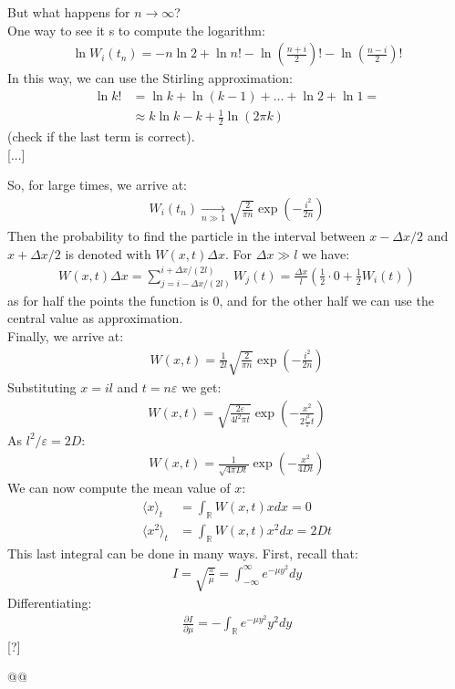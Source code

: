 \documentclass[../template.tex]{subfiles}
\begin{document}
But what happens for $n\to \infty$?\\
One way to see it s to compute the logarithm:
\begin{align*}
    \ln W_i(t_n) = -n \ln 2 + \ln n! - \ln \left(\frac{n+i}{2}\right)! - \ln \left(\frac{n-i}{2}\right)!
\end{align*}
In this way, we can use the Stirling approximation:
\begin{align*}
    \ln k! &= \ln k + \ln(k-1) + \dots + \ln 2 + \ln 1 = \\
    &\approx k\ln k - k  + \frac{1}{2} \ln(2\pi k) 
\end{align*}
(check if the last term is correct).\\

[...]

So, for large times, we arrive at: 
\begin{align*}
    W_i(t_n) \xrightarrow[n\gg 1]{} \sqrt{\frac{2}{\pi n}} \exp\left({-\frac{i^2}{2n}}\right)
\end{align*} 
Then the probability to find the particle in the interval between $x-\Delta x/2$ and $x+ \Delta x/2$ is denoted with $W(x,t) \Delta x$. For $\Delta x \gg l$ we have: 
\begin{align*}
    W(x,t) \Delta x = \sum_{j=i- \Delta x/(2l)}^{i+ \Delta x/(2l)} W_j(t) = \frac{\Delta x}{l} \left(\frac{1}{2} \cdot 0 + \frac{1}{2} W_i(t)\right)
\end{align*}    
as for half the points the function is $0$, and for the other half we can use the central value as approximation.\\
Finally, we arrive at: 
\begin{align*}
    W(x,t) = \frac{1}{2l} \sqrt{\frac{2}{\pi n}} \exp\left(-\frac{i^2}{2n}\right)
\end{align*}
Substituting $x=il$ and $t = n \varepsilon$ we get: 
\begin{align*}
    W(x,t) = \sqrt{\frac{2 \varepsilon}{4l^2 \pi t}} \exp \left(-\frac{x^2}{2 \frac{l^2}{\varepsilon} t}\right)
\end{align*}  
As $l^2/\varepsilon = 2D$: 
\begin{align*}
    W(x,t) = \frac{1}{\sqrt{4 \pi D t}} \exp\left(-\frac{x^2}{4Dt}\right)
\end{align*} 
We can now compute the mean value of $x$:
\begin{align*}
    \langle x \rangle_t &= \int_{\mathbb{R}} W(x,t) x dx = 0\\
    \langle x^2 \rangle_t &= \int_{\mathbb{R}} W(x,t) x^2 dx = 2Dt
\end{align*}
This last integral can be done in many ways. First, recall that: 
\begin{align*}
    I = \sqrt{\frac{\pi}{\mu}} = \int_{-\infty}^{\infty} e^{-\mu y^2}dy
\end{align*}
Differentiating: 
\begin{align*}
    \frac{\partial I}{\partial \mu} = - \int_{\mathbb{R}} e^{-\mu y^2} y^2 dy
\end{align*}
[?]

\to \mapsto \omega \Omega @@ \infty
\end{document}
